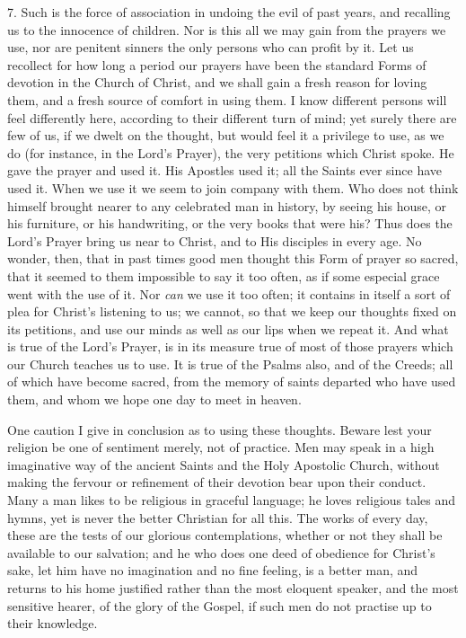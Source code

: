 7. Such is the force of association in undoing the
evil of past years, and recalling us to the innocence of
children. Nor is this all we may gain from the prayers we
use, nor are penitent sinners the only persons who can
profit by it. Let us recollect for how long a period our
prayers have been the standard Forms of devotion in the
Church of Christ, and we shall gain a fresh reason for
loving them, and a fresh source of comfort in using them.
I know different persons will feel differently here,
according to their different turn of mind; yet surely
there are few of us, if we dwelt on the thought, but
would feel it a privilege to use, as we do (for instance,
in the Lord's Prayer), the very petitions which Christ
spoke. He gave the prayer and used it. His Apostles used
it; all the Saints ever since have used it. When we use
it we seem to join company with them. Who does not think
himself brought nearer to any celebrated man in history,
by seeing his house, or his furniture, or his
handwriting, or the very books that were his? Thus does
the Lord's Prayer bring us near to Christ, and to His
disciples in every age. No wonder, then, that in past
times good men thought this Form of prayer so sacred,
that it seemed to them impossible to say it too often, as
if some especial grace went with the use of it. Nor \emph{can}
we use it too often; it contains in itself a sort of plea
for Christ's listening to us; we cannot, so that we keep
our thoughts fixed on its petitions, and use our minds as
well as our lips when we repeat it. And what is true of
the Lord's Prayer, is in its measure true of most of
those prayers which our Church teaches us to use. It is
true of the Psalms also, and of the Creeds; all of which
have become sacred, from the memory of saints departed
who have used them, and whom we hope one day to meet in
heaven.

One caution I give in conclusion as to using these
thoughts. Beware lest your religion be one of sentiment merely, not of practice. Men may speak in a high
imaginative way of the ancient Saints and the Holy
Apostolic Church, without making the fervour or
refinement of their devotion bear upon their conduct.
Many a man likes to be religious in graceful language; he
loves religious tales and hymns, yet is never the better
Christian for all this. The works of every day, these are
the tests of our glorious contemplations, whether or not
they shall be available to our salvation; and he who does
one deed of obedience for Christ's sake, let him have no
imagination and no fine feeling, is a better man, and
returns to his home justified rather than the most
eloquent speaker, and the most sensitive hearer, of the
glory of the Gospel, if such men do not practise up to
their knowledge.

